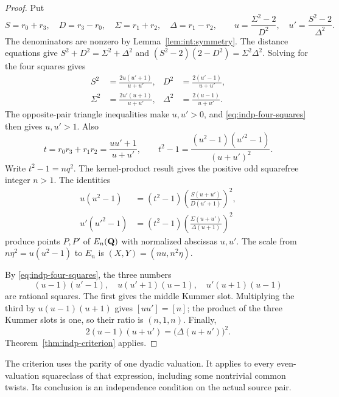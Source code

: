 \begin{proof}
Put
\[
 S=r_0+r_3,\quad D=r_3-r_0,\quad
 \Sigma=r_1+r_2,\quad \Delta=r_1-r_2,
 \qquad
 u=\frac{\Sigma^2-2}{D^2},\quad
 u'=\frac{S^2-2}{\Delta^2}.
\]
The denominators are nonzero by Lemma~\ref{lem:int:symmetry}.
The distance equations give
$S^2+D^2=\Sigma^2+\Delta^2$ and
$(S^2-2)(2-D^2)=\Sigma^2\Delta^2$.  Solving for the four
squares gives
\begin{equation}
\begin{aligned}
 S^2&=\frac{2u(u'+1)}{u+u'},&
 D^2&=\frac{2(u'-1)}{u+u'},\\
 \Sigma^2&=\frac{2u'(u+1)}{u+u'},&
 \Delta^2&=\frac{2(u-1)}{u+u'}.
\end{aligned}
\label{eq:indp-four-squares}
\end{equation}
The opposite-pair triangle inequalities make $u,u'>0$, and
\eqref{eq:indp-four-squares} then gives $u,u'>1$.
Also
\[
 t=r_0r_3+r_1r_2=\frac{uu'+1}{u+u'},\qquad
 t^2-1=\frac{(u^2-1)(u'^2-1)}{(u+u')^2}.
\]
Write $t^2-1=nq^2$.  The kernel-product result gives the positive
odd squarefree integer $n>1$.  The identities
\[
 \begin{aligned}
 u(u^2-1)&=(t^2-1)
   \left(\frac{S(u+u')}{D(u'+1)}\right)^2,\\
 u'(u'^2-1)&=(t^2-1)
   \left(\frac{\Sigma(u+u')}{\Delta(u+1)}\right)^2
 \end{aligned}
\]
produce points $P,P'$ of $E_n(\mathbf Q)$ with normalized abscissas
$u,u'$.  The scale from $n\eta^2=u(u^2-1)$ to $E_n$ is
$(X,Y)=(nu,n^2\eta)$.

By \eqref{eq:indp-four-squares}, the three numbers
\[
 (u-1)(u'-1),\quad u(u'+1)(u-1),\quad
 u'(u+1)(u-1)
\]
are rational squares.  The first gives the middle Kummer slot.
Multiplying the third by $u(u-1)(u+1)$ gives
$[uu']=[n]$; the product of the three Kummer slots is one,
so their ratio is $(n,1,n)$.
Finally,
\[
 2(u-1)(u+u')=\bigl(\Delta(u+u')\bigr)^2.
\]
Theorem~\ref{thm:indp-criterion} applies.
\end{proof}

The criterion uses the parity of one dyadic valuation.  It applies
to every even-valuation squareclass of that expression, including
some nontrivial common twists.  Its conclusion is an independence
condition on the actual source pair.
